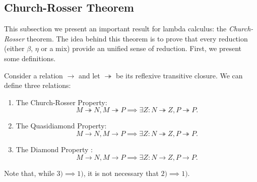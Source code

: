 


\subsection{Church-Rosser Theorem}

This subsection we present an important result for lambda calculus: the \emph{Church-Rosser} theorem. The idea behind this theorem is to prove that every reduction (either $\beta$, $\eta$ or a mix) provide an unified sense of reduction. First, we present some definitions.

\begin{definition}
  Consider a relation $\to$ and let $\twoheadrightarrow$ be its reflexive transitive closure. We can define three relations:

\begin{enumerate}
  \item The Church-Rosser Property: $$M\twoheadrightarrow N, M\twoheadrightarrow P \implies \exists Z : N\twoheadrightarrow Z, P\twoheadrightarrow P.$$
  \item The Quasidiamond Property: $$M\to N, M\to P \implies \exists Z : N\twoheadrightarrow Z, P\twoheadrightarrow P.$$
  \item The Diamond Property : $$M\to N, M\to P \implies \exists Z : N\to Z,P\to P.$$
  \end{enumerate}
\end{definition}

\begin{remark} 
  Note that, while $3)\implies 1)$, it is not necessary that $2)\implies 1)$.
\end{remark}


